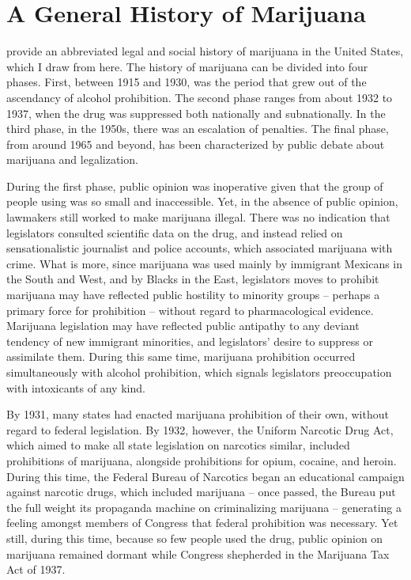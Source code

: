 \section{A General History of Marijuana}

\citet{bonnie_and_whitebread_1970} provide an abbreviated legal and social history of marijuana in the United States, which I draw from here. The history of marijuana can be divided into four phases. First, between 1915 and 1930, was the period that grew out of the ascendancy of alcohol prohibition. The second phase ranges from about 1932 to 1937, when the drug was suppressed both nationally and subnationally. In the third phase, in the 1950s, there was an escalation of penalties. The final phase, from around 1965 and beyond, has been characterized by public debate about marijuana and legalization. 

During the first phase, public opinion was inoperative given that the group of people using was so small and inaccessible. Yet, in the absence of public opinion, lawmakers still worked to make marijuana illegal. There was no indication that legislators consulted scientific data on the drug, and instead relied on sensationalistic journalist and police accounts, which associated marijuana with crime. What is more, since marijuana was used mainly by immigrant Mexicans in the South and West, and by Blacks in the East, legislators moves to prohibit marijuana may have reflected public hostility to minority groups -- perhaps a primary force for prohibition -- without regard to pharmacological evidence. Marijuana legislation may have reflected public antipathy to any deviant tendency of new immigrant minorities, and legislators' desire to suppress or assimilate them. During this same time, marijuana prohibition occurred simultaneously with alcohol prohibition, which signals legislators preoccupation with intoxicants of any kind. 

By 1931, many states had enacted marijuana prohibition of their own, without regard to federal legislation. By 1932, however, the Uniform Narcotic Drug Act, which aimed to make all state legislation on narcotics similar, included prohibitions of marijuana, alongside prohibitions for opium, cocaine, and heroin. During this time, the Federal Bureau of Narcotics began an educational campaign against narcotic drugs, which included marijuana -- once passed, the Bureau put the full weight its propaganda machine on criminalizing marijuana -- generating a feeling amongst members of Congress that federal prohibition was necessary. Yet still, during this time, because so few people used the drug, public opinion on marijuana remained dormant while Congress shepherded in the Marijuana Tax Act of 1937. 

